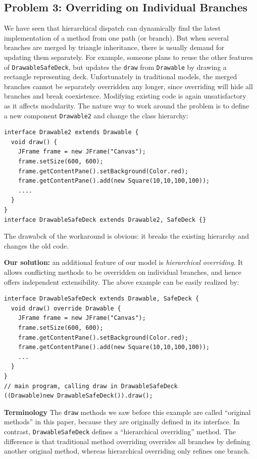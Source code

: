 \subsection{Problem 3: Overriding on Individual Branches}\label{subsec:partialoverrides}
We have seen that hierarchical dispatch can dynamically find the latest implementation of a method from one path (or branch). But when
several branches are merged by triangle inheritance, there is usually demand for updating them separately. For example, someone plans to
reuse the other features of \lstinline|DrawableSafeDeck|, but updates the \lstinline|draw| from \lstinline|Drawable| by drawing a rectangle representing deck. Unfortunately in traditional models, the merged branches cannot be separately overridden any longer, since overriding
will hide all branches and break coexistence. Modifying existing code is again unsatisfactory as it affects modularity. The nature way to work around the problem is to define a new component \lstinline|Drawable2| and change the class hierarchy:
\begin{lstlisting}
interface Drawable2 extends Drawable {
  void draw() {
    JFrame frame = new JFrame("Canvas");
    frame.setSize(600, 600);
    frame.getContentPane().setBackground(Color.red);
    frame.getContentPane().add(new Square(10,10,100,100));
    ....
  }
}
interface DrawableSafeDeck extends Drawable2, SafeDeck {}
\end{lstlisting} 
The drawabck of the workaround is obvious: it breaks the existing hierarchy and changes the old code.

\noindent\textbf{Our solution:} an additional feature of our model is \textit{hierarchical overriding}. It allows conflicting methods
to be overridden on individual branches, and hence offers independent extensibility. The above example can be easily realized by:
\vspace{3pt}\begin{lstlisting}
interface DrawableSafeDeck extends Drawable, SafeDeck {
  void draw() override Drawable {
    JFrame frame = new JFrame("Canvas");
    frame.setSize(600, 600);
    frame.getContentPane().setBackground(Color.red);
    frame.getContentPane().add(new Square(10,10,100,100));
    ...
  }
}
// main program, calling draw in DrawableSafeDeck
((Drawable)new DrawableSafeDeck()).draw(); 
\end{lstlisting}\vspace{3pt}

\textbf{Terminology} The \lstinline|draw| methods we saw before this example are called ``original methods'' in this paper, because they are originally defined in its interface.
In contrast, \lstinline|DrawableSafeDeck| defines a ``hierarchical overriding'' method. The difference is that traditional method overriding overrides all branches by defining another original method, whereas hierarchical overriding only refines one branch.


